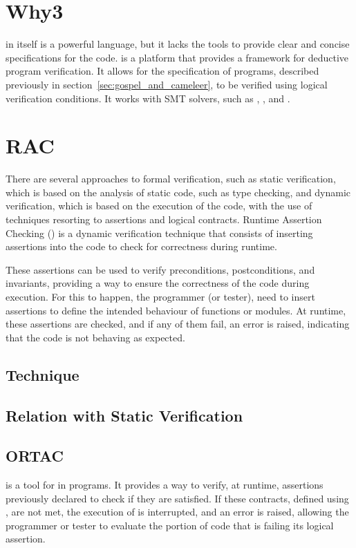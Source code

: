 \section{Why3}
\label{sec:why3}

\ocaml in itself is a powerful language, but it lacks the tools to provide clear 
and concise specifications for the code. \why is a platform that provides a framework 
for deductive program verification. It allows for the specification of programs, 
described previously in section~\ref{sec:gospel_and_cameleer}, to be verified using 
logical verification conditions. It works with SMT solvers, such as \zthree, \altergo, 
and \coq.

\section{RAC}
\label{sec:rac}

There are several approaches to formal verification, such as static verification, 
which is based on the analysis of static code, such as type checking, and dynamic 
verification, which is based on the execution of the code, with the use of 
techniques resorting to assertions and logical contracts. Runtime Assertion Checking 
(\rac) is a dynamic verification technique that consists of inserting assertions 
into the code to check for correctness during runtime.

These assertions can be used to verify preconditions, postconditions, and invariants, 
providing a way to ensure the correctness of the code during execution. For this to 
happen, the programmer (or tester), need to insert assertions to define the intended 
behaviour of functions or modules. At runtime, these assertions are checked, and if 
any of them fail, an error is raised, indicating that the code is not behaving as 
expected.

\subsection{Technique}
\label{sub:technique}

\subsection{Relation with Static Verification}
\label{sub:relation_with_static_verification}

\subsection{ORTAC}
\label{sub:ortac}

\ortac is a tool for \rac in \ocaml programs. It provides a way to verify, at runtime, 
assertions previously declared to check if they are satisfied. If these contracts, 
defined using \why, are not met, the execution of \ortac is interrupted, and an error 
is raised, allowing the programmer or tester to evaluate the portion of code that is 
failing its logical assertion.
